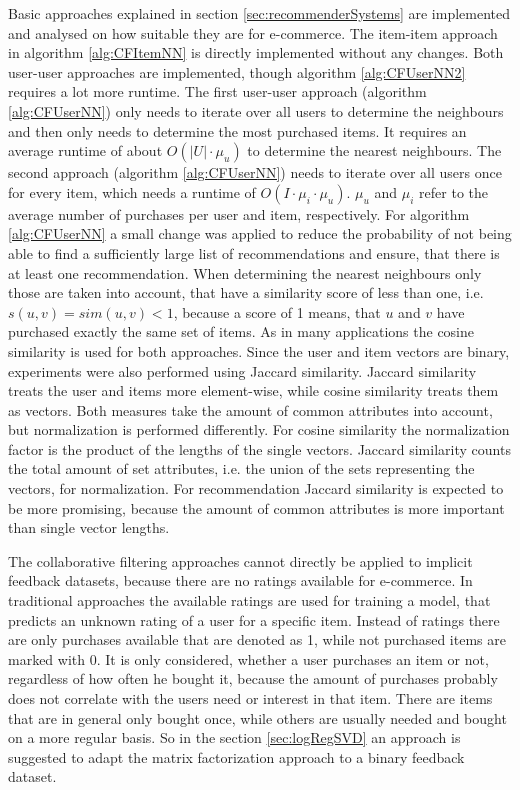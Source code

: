 \documentclass[10pt]{reportMaster}
\begin{document}
Basic approaches explained in section \ref{sec:recommenderSystems} are implemented and analysed on how suitable they are for e-commerce.
The item-item approach in algorithm \ref{alg:CFItemNN} is directly implemented without any changes.
Both user-user approaches are implemented, though algorithm \ref{alg:CFUserNN2} requires a lot more runtime.
The first user-user approach (algorithm \ref{alg:CFUserNN}) only needs to iterate over all users to determine the neighbours and then only needs to determine the most purchased items.
It requires an average runtime of about $O(|U| \cdot \mu_u)$ to determine the nearest neighbours.
The second approach (algorithm \ref{alg:CFUserNN}) needs to iterate over all users once for every item, which needs a runtime of $O(I \cdot \mu_i \cdot \mu_u)$.
$\mu_u$ and $\mu_i$ refer to the average number of purchases per user and item, respectively.
For algorithm \ref{alg:CFUserNN} a small change was applied to reduce the probability of not being able to find a sufficiently large list of recommendations and ensure, that there is at least one recommendation.
When determining the nearest neighbours only those are taken into account, that have a similarity score of less than one, i.e. $s(u,v) = sim(u, v) < 1$, because a score of 1 means, that $u$ and $v$ have purchased exactly the same set of items.
As in many applications the cosine similarity is used for both approaches.
Since the user and item vectors are binary, experiments were also performed using Jaccard similarity.
Jaccard similarity treats the user and items more element-wise, while cosine similarity treats them as vectors.
Both measures take the amount of common attributes into account, but normalization is performed differently.
For cosine similarity the normalization factor is the product of the lengths of the single vectors.
Jaccard similarity counts the total amount of set attributes, i.e. the union of the sets representing the vectors, for normalization.
For recommendation Jaccard similarity is expected to be more promising, because the amount of common attributes is more important than single vector lengths.

The collaborative filtering approaches cannot directly be applied to implicit feedback datasets, because there are no ratings available for e-commerce.
In traditional approaches the available ratings are used for training a model, that predicts an unknown rating of a user for a specific item.
Instead of ratings there are only purchases available that are denoted as 1, while not purchased items are marked with 0.
It is only considered, whether a user purchases an item or not, regardless of how often he bought it, because the amount of purchases probably does not correlate with the users need or interest in that item.
There are items that are in general only bought once, while others are usually needed and bought on a more regular basis. 
So in the section \ref{sec:logRegSVD} an approach is suggested to adapt the matrix factorization approach to a binary feedback dataset.
\end{document}
